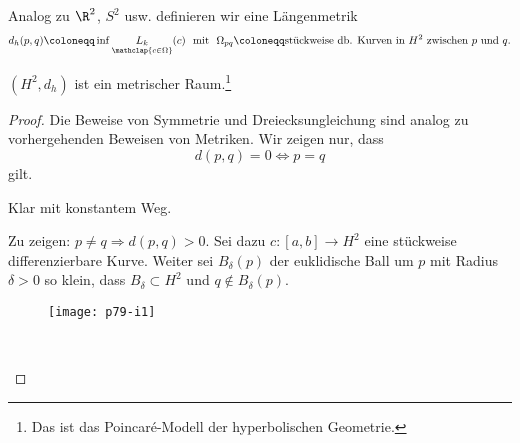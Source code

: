 \begin{definition}
  Analog zu \( \R^2 \), \( S^2 \) usw. definieren wir eine Längenmetrik
  \begin{equation*}
    d_h(p,q) \coloneqq \inf \underset{\mathclap{c \in \Omega}}{L_k}(c) \ \text{ mit } \ \Omega_{pq} \coloneqq \text{stückweise db. Kurven in \( H^2 \) zwischen \( p \) und \( q \).}
  \end{equation*}
\end{definition}

\begin{theorem}
  \( (H^2, d_h) \) ist ein metrischer Raum.\footnote{Das ist das Poincaré-Modell der hyperbolischen Geometrie.}

  \begin{proof}
    Die Beweise von Symmetrie und Dreiecksungleichung sind analog zu vorhergehenden Beweisen von Metriken. Wir zeigen nur, dass
    \begin{equation*}
      d(p,q) = 0 \Leftrightarrow p = q
    \end{equation*}
    gilt.
    \begin{itemize}
      \item[\( \Leftarrow \)] Klar mit konstantem Weg.

      \begin{minipage}{.6\textwidth}
        \vspace{1em}
        \item[\( \Rightarrow \)] Zu zeigen: \( p \neq q \Rightarrow d(p,q) > 0 \). Sei dazu \( c:[a,b] \to H^2 \) eine stückweise differenzierbare Kurve. Weiter sei \( B_\delta(p) \) der euklidische Ball um \( p \) mit Radius \( \delta > 0 \) so klein, dass \( B_\delta \subset H^2 \) und \( q \not \in B_\delta(p) \).        
      \end{minipage}
      \hfill
      \begin{minipage}{.375\textwidth}
        \begin{figure}[H]
          \texttt{[image: p79-i1]}
        \end{figure}
      \end{minipage}
      \ \\


\end{itemize}
\end{proof}
\end{theorem}
